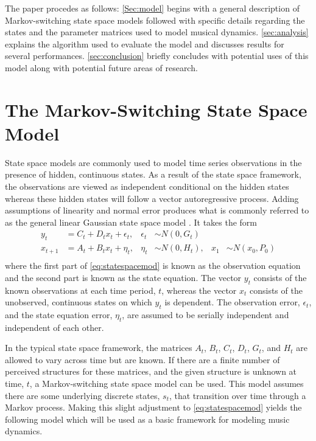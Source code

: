 \documentclass[12pt]{article}
\begin{document}
\def\sectionautorefname{Section}

The paper procedes as follows: \autoref{Sec:model} begins with a general
description of Markov-switching state space models followed with
specific details regarding the states and the parameter matrices used to
model musical dynamics. \autoref{sec:analysis} explains the algorithm
used to evaluate the model and discusses results for several
performances. \autoref{sec:conclusion} briefly concludes with potential
uses of this model along with potential future areas of research.

\section{The Markov-Switching State Space Model}
\label{Sec:model}

State space models are commonly used to model time series observations
in the presence of hidden, continuous states. As a result of the state
space framework, the observations are viewed as independent conditional
on the hidden states whereas these hidden states will follow a vector
autoregressive process. Adding assumptions of linearity and normal error
produces what is commonly referred to as the general linear Gaussian
state space model \citep{durbin_time_2012}. It takes the form
\begin{equation}
  \begin{aligned}
    y_t &= C_t + D_tx_t + \epsilon_t, 
    & \epsilon_t & \sim N(0,G_t)\\
    x_{t+1} &= A_t + B_tx_t + \eta_t, 
    & \eta_t & \sim N(0,H_t), 
    & x_1 & \sim N(x_0,P_0) \\
  \end{aligned}
  \label{eq:statespacemod}
\end{equation} where the first part of \autoref{eq:statespacemod} is
known as the observation equation and the second part is known as the
state equation. The vector \(y_t\) consists of the known observations at
each time period, \(t\), whereas the vector \(x_t\) consists of the
unobserved, continuous states on which \(y_t\) is dependent. The
observation error, \(\epsilon_t\), and the state equation error,
\(\eta_t\), are assumed to be serially independent and independent of
each other.

In the typical state space framework, the matrices \(A_t\), \(B_t\),
\(C_t\), \(D_t\), \(G_t\), and \(H_t\) are allowed to vary across time
but are known. If there are a finite number of perceived structures for
these matrices, and the given structure is unknown at time, \(t\), a
Markov-switching state space model can be used. This model assumes there
are some underlying discrete states, \(s_t\), that transition over time
through a Markov process. Making this slight adjustment to
\autoref{eq:statespacemod} yields the following model which will be used
as a basic framework for modeling music dynamics.
\end{document}
